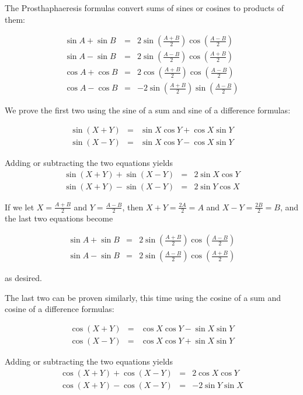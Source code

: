 \documentclass[12pt]{article}
\begin{document}
The Prosthaphaeresis formulas convert sums of sines or cosines to products of them:

\begin{eqnarray*}
\sin A + \sin B &=& 2 \sin \left( \frac{A+B}{2} \right) \cos \left (\frac{A-B}{2} \right) \\
\sin A - \sin B &=& 2 \sin \left( \frac{A-B}{2} \right) \cos \left (\frac{A+B}{2} \right) \\
\cos A + \cos B &=& 2 \cos \left( \frac{A+B}{2} \right) \cos \left (\frac{A-B}{2} \right) \\
\cos A - \cos B &=& -2 \sin \left( \frac{A+B}{2} \right) \sin \left (\frac{A-B}{2} \right)
\end{eqnarray*}

We prove the first two using the sine of a sum and sine of a difference formulas:

\begin{eqnarray*}
\sin (X+Y) &=& \sin X \cos Y + \cos X \sin Y \\
\sin (X-Y) &=& \sin X \cos Y - \cos X \sin Y
\end{eqnarray*}

Adding or subtracting the two equations yields
\begin{eqnarray*}
\sin (X+Y) + \sin (X-Y) &=& 2 \sin X \cos Y \\
\sin (X+Y) - \sin (X-Y) &=& 2 \sin Y \cos X
\end{eqnarray*}

If we let $X = \frac{A+B}{2}$ and $Y = \frac{A-B}{2}$, then $X+Y = \frac{2A}{2} = A$ and $X-Y = \frac{2B}{2} = B$, and the last two equations become

\begin{eqnarray*}
\sin A + \sin B &=& 2 \sin \left( \frac{A+B}{2} \right) \cos \left (\frac{A-B}{2} \right) \\
\sin A - \sin B &=& 2 \sin \left( \frac{A-B}{2} \right) \cos \left (\frac{A+B}{2} \right)
\end{eqnarray*}

as desired.

The last two can be proven similarly, this time using the cosine of a sum and cosine of a difference formulas:

\begin{eqnarray*}
\cos (X+Y) &=& \cos X \cos Y - \sin X \sin Y \\
\cos (X-Y) &=& \cos X \cos Y + \sin X \sin Y
\end{eqnarray*}

Adding or subtracting the two equations yields
\begin{eqnarray*}
\cos (X+Y) + \cos(X-Y) &=& 2 \cos X \cos Y \\
\cos (X+Y) - \cos(X-Y) &=& - 2 \sin Y \sin X
\end{eqnarray*}
\end{document}
